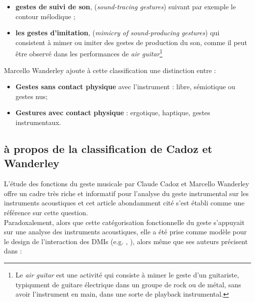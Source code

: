 \begin{itemize}[noitemsep]
	\vspace{-0.5em}
	\begin{itemize}[noitemsep]
		\item \textbf{gestes de suivi de son}, (\textit{sound-tracing gestures}) suivant par exemple le contour mélodique \cite{godoy_exploring_2006};
		\item \textbf{les gestes d'imitation}, (\textit{mimicry of sound-producing gestures}) qui consistent à mimer ou imiter des gestes de production du son, comme il peut être observé dans les performances de \textit{air guitar}\footnote{Le \textit{air guitar} est une activité qui consiste à mimer le geste d’un guitariste, typiqument de guitare électrique dans un groupe de rock ou de métal, sans avoir l’instrument en main, dans une sorte de playback instrumental.} \cite{godoy_playing_2005}
	\end{itemize}
\end{itemize}


\noindent Marcello Wanderley ajoute à cette classification une distinction entre :
\vspace{-1em}
\begin{itemize}[noitemsep]
\item \textbf{Gestes sans contact physique} avec l'instrument : libre, sémiotique ou gestes nus;
\item \textbf{Gestures avec contact physique} : ergotique, haptique, gestes instrumentaux.
\end{itemize}

\subsection{à propos de la classification de Cadoz et Wanderley}

L'étude des fonctions du geste musicale par Claude Cadoz et Marcello Wanderley offre un cadre très riche et informatif pour l'analyse du geste instrumental sur les instruments acoustiques et cet article abondamment cité s'est établi comme une référence sur cette question.\\
Paradoxalement, alors que cette catégorisation fonctionnelle du geste s'appuyait sur une analyse des instruments acoustiques, elle a été prise comme modèle pour le design de l'interaction des \glspl{DMI} (e.g. \cite{arfib_strategies_2002}, \cite{schwarz_sound_2012}), alors même que ses auteurs précisent dans \cite{cadoz_gesture_2000}:\\

